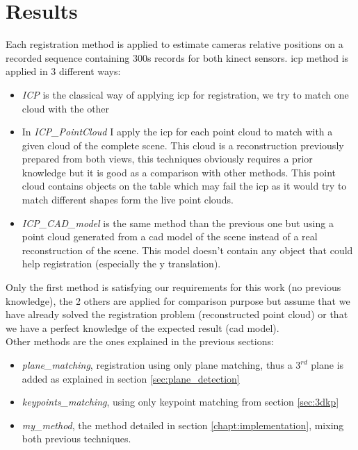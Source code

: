 
\chapter{Results}

Each registration method is applied to estimate cameras relative positions on a recorded sequence containing 300s records for both kinect sensors. \acrshort{icp} method is applied in 3 different ways:

\begin{itemize}
    \item \emph{ICP} is the classical way of applying \acrshort{icp} for registration, we try to match one cloud with the other
    \item In \emph{ICP\_PointCloud} I apply the \acrshort{icp} for each point cloud to match with a given cloud of the complete scene. This cloud is a reconstruction previously prepared from both views, this techniques obviously requires a prior knowledge but it is good as a comparison with other methods. This point cloud contains objects on the table which may fail the \acrshort{icp} as it would try to match different shapes form the live point clouds.
    \item \emph{ICP\_CAD\_model} is the same method than the previous one but using a point cloud generated from a \acrshort{cad} model of the scene instead of a real reconstruction of the scene. This model doesn't contain any object that could help registration (especially the y translation).
\end{itemize}
Only the first method is satisfying our requirements for this work (no previous knowledge), the 2 others are applied for comparison purpose but assume that we have already solved the registration problem (reconstructed point cloud) or that we have a perfect knowledge of the expected result (\acrshort{cad} model). \\
Other methods are the ones explained in the previous sections:
\begin{itemize}
    \item \emph{plane\_matching}, registration using only plane matching, thus a $3^{rd}$ plane is added as explained in section \ref{sec:plane_detection}
    \item \emph{keypoints\_matching}, using only keypoint matching from section \ref{sec:3dkp}
    \item \emph{my\_method}, the method detailed in section \ref{chapt:implementation}, mixing both previous techniques.
\end{itemize}

